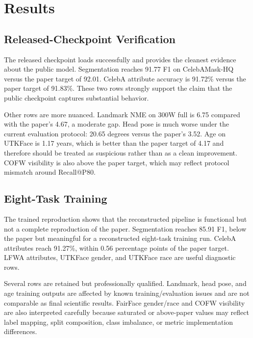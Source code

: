 \section{Results}
\label{sec:results}

\subsection{Released-Checkpoint Verification}

The released checkpoint loads successfully and provides the cleanest evidence about the public model. Segmentation reaches 91.77 F1 on CelebAMask-HQ versus the paper target of 92.01. CelebA attribute accuracy is 91.72\% versus the paper target of 91.83\%. These two rows strongly support the claim that the public checkpoint captures substantial \method behavior.

Other rows are more nuanced. Landmark NME on 300W full is 6.75 compared with the paper's 4.67, a moderate gap. Head pose is much worse under the current evaluation protocol: 20.65 degrees versus the paper's 3.52. Age on UTKFace is 1.17 years, which is better than the paper target of 4.17 and therefore should be treated as suspicious rather than as a clean improvement. COFW visibility is also above the paper target, which may reflect protocol mismatch around Recall@P80.

\subsection{Eight-Task Training}

The trained reproduction shows that the reconstructed pipeline is functional but not a complete reproduction of the paper. Segmentation reaches 85.91 F1, below the paper but meaningful for a reconstructed eight-task training run. CelebA attributes reach 91.27\%, within 0.56 percentage points of the paper target. LFWA attributes, UTKFace gender, and UTKFace race are useful diagnostic rows.

Several rows are retained but professionally qualified. Landmark, head pose, and age training outputs are affected by known training/evaluation issues and are not comparable as final scientific results. FairFace gender/race and COFW visibility are also interpreted carefully because saturated or above-paper values may reflect label mapping, split composition, class imbalance, or metric implementation differences.

